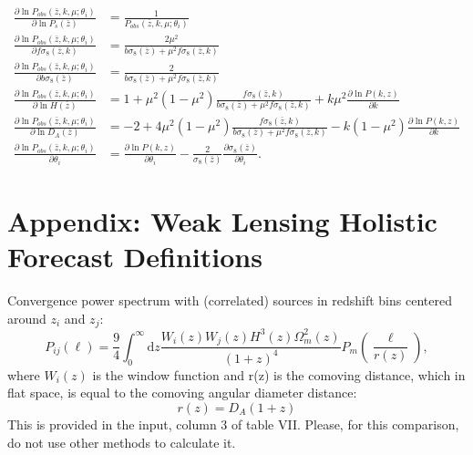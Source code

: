 \begin{subequations}

\begin{align}
\frac{\partial\ln P_{obs}\left(\bar{z},k,\mu;\theta_{i}\right)}{\partial\ln P_{s}(\bar{z})} & =\frac{1}{P_{obs}\left(\bar{z},k,\mu;\theta_{i}\right)}\\
\frac{\partial\ln P_{obs}\left(\bar{z},k,\mu;\theta_{i}\right)}{\partial f \sigma_8(\bar{z},k)} & = \frac{2 \mu^2}{b\sigma_8(\bar{z}) + \mu^2 f \sigma_8(\bar{z},k)}\\
\frac{\partial\ln P_{obs}\left(\bar{z},k,\mu;\theta_{i}\right)}{\partial b\sigma_8(\bar{z})} & = \frac{2 }{b\sigma_8(\bar{z}) + \mu^2 f \sigma_8(\bar{z},k)}\\
\frac{\partial\ln P_{obs}\left(\bar{z},k,\mu;\theta_{i}\right)}{\partial\ln H(\bar{z})} & = 1 + \mu^2 \left(1 - \mu^2\right) \frac{ f \sigma_8(\bar{z},k)
  }{b\sigma_8(\bar{z}) + 
     \mu^2 f \sigma_8(\bar{z},k)} + k \mu^2 \frac{\partial \ln P(k,z)}{\partial k}\\
\frac{\partial\ln P_{obs}\left(\bar{z},k,\mu;\theta_{i}\right)}{\partial\ln D_{A}(\bar{z})} & =  
-2 + 4 \mu^2 \left(1 - \mu^2\right)\frac{ f \sigma_8(\bar{z},k)}{
  b\sigma_8(\bar{z}) + \mu^2 f \sigma_8(\bar{z},k)} - 
k (1 - \mu^2) \frac{\partial \ln P(k,z)}{\partial k}
\\
\frac{\partial\ln P_{obs}\left(\bar{z},k,\mu;\theta_{i}\right)}{\partial \theta_i} & = \frac{\partial \ln P(k,z)}{\partial \theta_i} - 
\frac{2}{\sigma_8(\bar{z})} \frac{\partial \sigma_8(\bar{z})}{\partial \theta_i}. \label{eq: partial-derivs-subeqns-sigma8}
\end{align}
\label{eq: partial-derivs-subeqns}

\end{subequations}


\section*{Appendix: Weak Lensing Holistic Forecast Definitions}
Convergence power spectrum with (correlated) sources in redshift bins centered around $z_i$ and $z_j$:
\begin{equation}
P_{ij}(\ell)=\frac{9}{4}\int_{0}^{\infty}\mathrm{d}z\frac{W_{i}(z)W_{j}(z)H^{3}(z)\Omega_{m}^{2}(z)}{(1+z)^{4}}P_{m}\left(\frac{\ell}{ r(z)}\right),\label{eq:pstomog}
\end{equation}
 where $W_{i}(z)$ is the window function and r(z) is the comoving distance, which in flat space, is equal to the comoving angular diameter distance:
 \begin{equation}
r(z) = D_A(1+z)
 \end{equation}
This is provided in the input, column 3 of table VII. Please, for this comparison, do not use other methods to calculate it.
 
